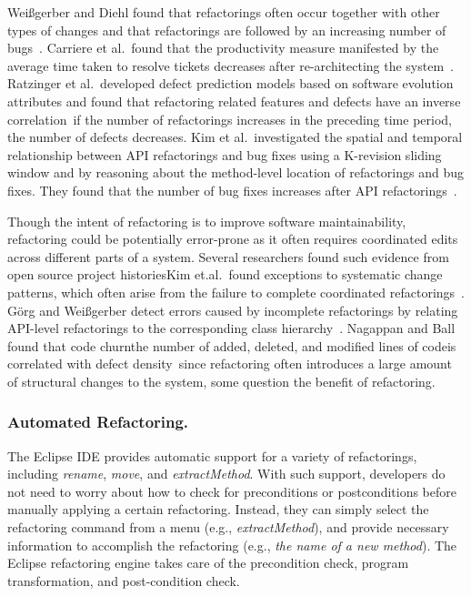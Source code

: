 Wei{\ss}gerber and Diehl found that refactorings often occur together with other types of changes and that refactorings are followed by an increasing number of bugs~\cite{Weissgerber2006:refactor}. Carriere et al.~found that the productivity measure manifested by the average time taken to resolve tickets decreases after re-architecting the system~\cite{Carriere2010:architecture}. Ratzinger et al.~developed defect prediction models based on software evolution attributes and found that refactoring related features and defects have an inverse correlation~\cite{Ratzinger2008:refactor}\textemdash if the number of refactorings increases in the preceding time period, the number of defects decreases. Kim et al.~investigated the spatial and temporal relationship between API refactorings and bug fixes using a K-revision sliding window and by reasoning about the method-level location of refactorings and bug fixes. They found that the number of bug fixes increases after API refactorings~\cite{Kim2011:refactorbug}.  

Though the intent of refactoring is to improve software maintainability, refactoring could be potentially error-prone as it often requires coordinated edits across different parts of a system. Several researchers found such evidence from open source project histories\textemdash Kim et.al.~found exceptions to systematic change patterns, which often arise from the failure to complete coordinated refactorings~\cite{Kim2007,Kim:2009}. G{\"o}rg and Wei{\ss}gerber detect errors caused by incomplete refactorings by relating API-level refactorings to the corresponding class hierarchy~\cite{Gorg2005a}. Nagappan and Ball found that code churn\textemdash the number of added, deleted, and modified lines of code\textemdash is correlated with defect density~\cite{Nagappan2005}\textemdash since refactoring often introduces a large amount of structural changes to the system, some question the benefit of refactoring. 

\subsubsection{Automated Refactoring.} 
\label{sec:automatedrefactoring} 

The Eclipse IDE provides automatic support for a variety of refactorings, including \emph{rename}, \emph{move}, and \emph{extractMethod}. With such support, developers do not need to worry about how to check for preconditions or postconditions before manually applying a certain refactoring. Instead, they can simply select the refactoring command from a menu (e.g., \emph{extractMethod}), and provide necessary information to accomplish the refactoring (e.g., \emph{the name of a new method}). The Eclipse refactoring engine takes care of the precondition check, program transformation, and post-condition check. 

